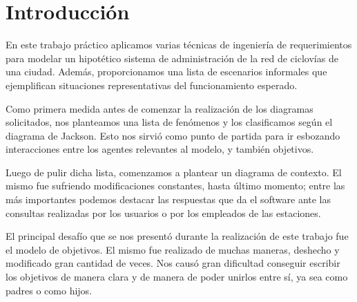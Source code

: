 \documentclass[a4paper, 10pt, twoside]{article}
\begin{document}
\newpage




\tableofcontents

\newpage




\section{Introducción}

En este trabajo práctico aplicamos varias técnicas de ingeniería de requerimientos para modelar un hipotético sistema de administración de la red de ciclovías de una ciudad. Además, proporcionamos una lista de escenarios informales que ejemplifican situaciones representativas del funcionamiento esperado.




Como primera medida antes de comenzar la realización de los diagramas solicitados, nos planteamos una lista de fenómenos y los clasificamos según el diagrama de Jackson. Esto nos sirvió como punto de partida para ir esbozando interacciones entre los agentes relevantes al modelo, y también objetivos.

Luego de pulir dicha lista, comenzamos a plantear un diagrama de contexto. El mismo fue sufriendo modificaciones constantes, hasta último momento; entre las más importantes podemos destacar las respuestas que da el software ante las consultas realizadas por los usuarios o por los empleados de las estaciones.

El principal desafío que se nos presentó durante la realización de este trabajo fue el modelo de objetivos. El mismo fue realizado de muchas maneras, deshecho y modificado gran cantidad de veces. Nos causó gran dificultad conseguir escribir los objetivos de manera clara y de manera de poder unirlos entre sí, ya sea como padres o como hijos. 
\end{document}
